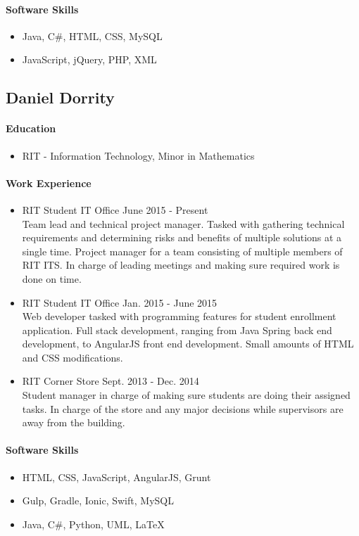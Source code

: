 	\paragraph{Software Skills}
		\begin{itemize}
			\item Java, C\#, HTML, CSS, MySQL
			\item JavaScript, jQuery, PHP, XML
		\end{itemize}

\subsection{Daniel Dorrity}
	\paragraph{Education}
		\begin{itemize}
			\item RIT - Information Technology, Minor in Mathematics
		\end{itemize}
	\paragraph{Work Experience}
		\begin{itemize}
			\item RIT Student IT Office \hfill June 2015 - Present\\
			Team lead and technical project manager. Tasked with gathering technical requirements and determining risks and benefits of multiple solutions at a single time. Project manager for a team consisting of multiple members of RIT ITS. In charge of leading meetings and making sure required work is done on time. 
			\item RIT Student IT Office \hfill Jan. 2015 - June 2015\\
			Web developer tasked with programming features for student enrollment application. Full stack development, ranging from Java Spring back end development, to AngularJS front end development. Small amounts of HTML and CSS modifications. 
			\item RIT Corner Store \hfill Sept. 2013 - Dec. 2014\\
			Student manager in charge of making sure students are doing their assigned tasks. In charge of the store and any major decisions while supervisors are away from the building.
		\end{itemize}
	\paragraph{Software Skills}
		\begin{itemize}
			\item HTML, CSS, JavaScript, AngularJS, Grunt
			\item Gulp, Gradle, Ionic, Swift, MySQL
			\item Java, C\#, Python, UML, LaTeX
		\end{itemize}
